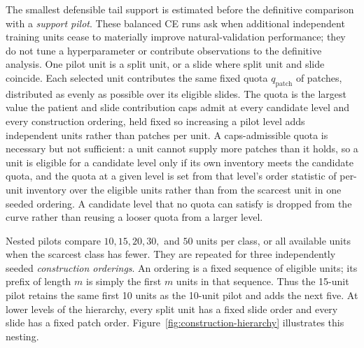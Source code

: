 \documentclass[11pt]{article}
\begin{document}
The smallest defensible tail support is estimated before the definitive comparison with a \emph{support pilot}. These balanced CE runs ask when additional independent training units cease to materially improve natural-validation performance; they do not tune a hyperparameter or contribute observations to the definitive analysis. One pilot unit is a split unit, or a slide where split unit and slide coincide. Each selected unit contributes the same fixed quota $q_{\mathrm{patch}}$ of patches, distributed as evenly as possible over its eligible slides. The quota is the largest value the patient and slide contribution caps admit at every candidate level and every construction ordering, held fixed so increasing a pilot level adds independent units rather than patches per unit. A caps-admissible quota is necessary but not sufficient: a unit cannot supply more patches than it holds, so a unit is eligible for a candidate level only if its own inventory meets the candidate quota, and the quota at a given level is set from that level's order statistic of per-unit inventory over the eligible units rather than from the scarcest unit in one seeded ordering. A candidate level that no quota can satisfy is dropped from the curve rather than reusing a looser quota from a larger level.

Nested pilots compare $10,15,20,30,$ and $50$ units per class, or all available units when the scarcest class has fewer. They are repeated for three independently seeded \emph{construction orderings}. An ordering is a fixed sequence of eligible units; its prefix of length $m$ is simply the first $m$ units in that sequence. Thus the 15-unit pilot retains the same first 10 units as the 10-unit pilot and adds the next five. At lower levels of the hierarchy, every split unit has a fixed slide order and every slide has a fixed patch order. Figure~\ref{fig:construction-hierarchy} illustrates this nesting.
\end{document}
